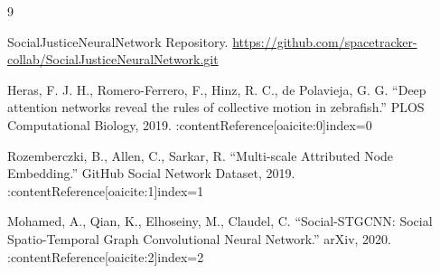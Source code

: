 \documentclass[12pt]{article}
\begin{document}
\begin{thebibliography}{9}

SocialJusticeNeuralNetwork Repository.  
\url{https://github.com/spacetracker-collab/SocialJusticeNeuralNetwork.git}

Heras, F. J. H., Romero-Ferrero, F., Hinz, R. C., de Polavieja, G. G.  
``Deep attention networks reveal the rules of collective motion in zebrafish.''  
PLOS Computational Biology, 2019. :contentReference[oaicite:0]{index=0}

Rozemberczki, B., Allen, C., Sarkar, R.  
``Multi-scale Attributed Node Embedding.''  
GitHub Social Network Dataset, 2019. :contentReference[oaicite:1]{index=1}

Mohamed, A., Qian, K., Elhoseiny, M., Claudel, C.  
``Social-STGCNN: Social Spatio-Temporal Graph Convolutional Neural Network.''  
arXiv, 2020. :contentReference[oaicite:2]{index=2}

\end{thebibliography}
\end{document}
